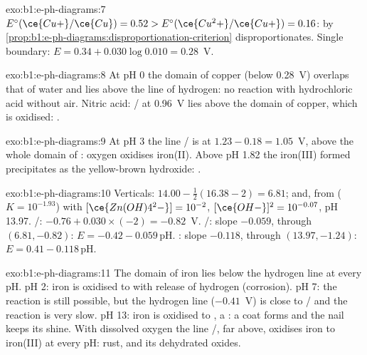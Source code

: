 \begin{solution}{exo:b1:e-ph-diagrams:7}
$E^\circ(\ce{Cu+}/\ce{Cu}) = 0.52 > E^\circ(\ce{Cu^2+}/\ce{Cu+}) = 0.16$: by
\cref{prop:b1:e-ph-diagrams:disproportionation-criterion} 
disproportionates. Single boundary: $E = 0.34 + 0.030\log 0.010 =
0.28$~V.
\end{solution}

\begin{solution}{exo:b1:e-ph-diagrams:8}
At pH 0 the domain of copper (below 0.28~V) overlaps that of water and
lies above the line of hydrogen: no reaction with hydrochloric acid
without air. Nitric acid: / at 0.96~V lies above the
domain of copper, which is oxidised:
.
\end{solution}

\begin{solution}{exo:b1:e-ph-diagrams:9}
At pH 3 the line / is at $1.23 - 0.18 = 1.05$~V, above the
whole domain of : oxygen oxidises iron(II). Above pH 1.82 the
iron(III) formed precipitates as the yellow-brown hydroxide:
.
\end{solution}

\begin{solution}{exo:b1:e-ph-diagrams:10}
Verticals: $14.00 - \frac12(16.38 - 2) = 6.81$; and, from
 ($K = 10^{-1.93}$) with
$[\ce{Zn(OH)4^2-}] = 10^{-2}$, $[\ce{OH-}]^2 = 10^{-0.07}$, pH 13.97.
/: $-0.76 + 0.030 \times (-2) = -0.82$~V. /:
slope $-0.059$, through $(6.81, -0.82)$: $E = -0.42 - 0.059\,\mathrm{pH}$.
: slope $-0.118$, through
$(13.97, -1.24)$: $E = 0.41 - 0.118\,\mathrm{pH}$.
\end{solution}

\begin{solution}{exo:b1:e-ph-diagrams:11}
The domain of iron lies below the hydrogen line at every pH. pH 2: iron
is oxidised to  with release of hydrogen (corrosion). pH 7:
the reaction is still possible, but the hydrogen line ($-0.41$~V) is
close to / and the reaction is very slow. pH 13: iron is
oxidised to , a : a coat forms and the
nail keeps its shine. With dissolved oxygen the line /,
far above, oxidises iron to iron(III) at every pH: rust, 
and its dehydrated oxides.
\end{solution}

